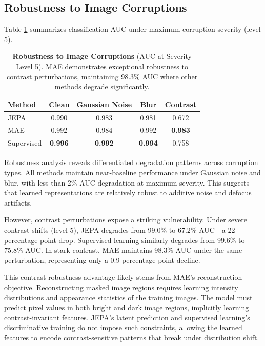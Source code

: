 \documentclass[11pt,a4paper]{article}
\begin{document}
\subsection{Robustness to Image Corruptions}

Table \ref{tab:robustness} summarizes classification AUC under maximum corruption severity (level 5).

\begin{table}[h]
\centering
\caption{\textbf{Robustness to Image Corruptions} (AUC at Severity Level 5). MAE demonstrates exceptional robustness to contrast perturbations, maintaining 98.3\% AUC where other methods degrade significantly.}
\label{tab:robustness}
\begin{tabular}{@{}lcccc@{}}
\toprule
\textbf{Method} & \textbf{Clean} & \textbf{Gaussian Noise} & \textbf{Blur} & \textbf{Contrast} \\
\midrule
JEPA & 0.990 & 0.983 & 0.981 & 0.672 \\
MAE & 0.992 & 0.984 & 0.992 & \textbf{0.983} \\
Supervised & \textbf{0.996} & \textbf{0.992} & \textbf{0.994} & 0.758 \\
\bottomrule
\end{tabular}
\end{table}

Robustness analysis reveals differentiated degradation patterns across corruption types. All methods maintain near-baseline performance under Gaussian noise and blur, with less than 2\% AUC degradation at maximum severity. This suggests that learned representations are relatively robust to additive noise and defocus artifacts.

However, contrast perturbations expose a striking vulnerability. Under severe contrast shifts (level 5), JEPA degrades from 99.0\% to 67.2\% AUC—a 22 percentage point drop. Supervised learning similarly degrades from 99.6\% to 75.8\% AUC. In stark contrast, MAE maintains 98.3\% AUC under the same perturbation, representing only a 0.9 percentage point decline.

This contrast robustness advantage likely stems from MAE's reconstruction objective. Reconstructing masked image regions requires learning intensity distributions and appearance statistics of the training images. The model must predict pixel values in both bright and dark image regions, implicitly learning contrast-invariant features. JEPA's latent prediction and supervised learning's discriminative training do not impose such constraints, allowing the learned features to encode contrast-sensitive patterns that break under distribution shift.
\end{document}
